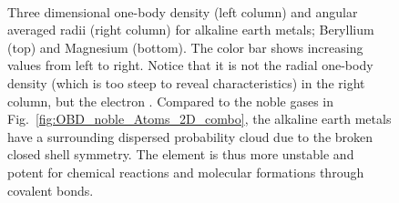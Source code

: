 \begin{figure}
\begin{center}
     \\
   \vspace{0.5cm}
   \vspace{0.5cm}
  \caption{Three dimensional one-body density (left column) and angular averaged radii (right column) for alkaline earth metals; Beryllium (top) and Magnesium (bottom). The color bar shows increasing values from left to right. Notice that it is not the radial one-body density (which is too steep to reveal characteristics) in the right column, but the electron . Compared to the noble gases in Fig.~\ref{fig:OBD_noble_Atoms_2D_combo}, the alkaline earth metals have a surrounding dispersed probability cloud due to the broken closed shell symmetry. The element is thus more unstable and potent for chemical reactions and molecular formations through covalent bonds.}
  \label{fig:OBD_alkaline_Atoms_2D_combo}
 \end{center}
\end{figure}